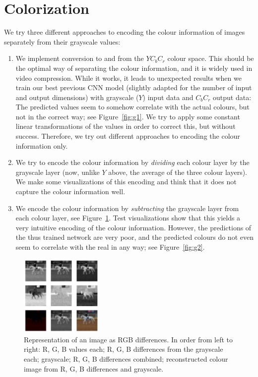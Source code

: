 \documentclass[conference]{IEEEtran}
\begin{document}
\newpage

\section{Colorization}

We try three different approaches to encoding the colour information of images separately from their grayscale values: 

\begin{enumerate}
    \item We implement conversion to and from the $YC_bC_r$ colour space. This should be the optimal way of separating the colour information, and it is widely used in video compression. While it works, it leads to unexpected results when we train our best previous CNN model (slightly adapted for the number of input and output dimensions) with grayscale ($Y$) input data and $C_bC_r$ output data: The predicted values seem to somehow correlate with the actual colours, but not in the correct way; see Figure~\ref{fig:g1}. We try to apply some constant linear transformations of the values in order to correct this, but without success. Therefore, we try out different approaches to encoding the colour information only. 
    \item We try to encode the colour information by \textit{dividing} each colour layer by the grayscale layer (now, unlike $Y$ above, the average of the three colour layers). We make some visualizations of this encoding and think that it does not capture the colour information well.
    \item We encode the colour information by \textit{subtracting} the grayscale layer from each colour layer, see Figure~\ref{fig:genc}. Test visualizations show that this yields a very intuitive encoding of the colour information. However, the predictions of the thus trained network are very poor, and the predicted colours do not even seem to correlate with the real in any way; see Figure~\ref{fig:g2}.
\end{enumerate}

\begin{figure}[b]
    \centering
    \includegraphics[width=4cm]{encoding.png}
    \caption{Representation of an image as RGB differences. In order from left to right: R, G, B values each; R, G, B differences from the grayscale each; grayscale; R, G, B differences combined; reconstructed colour image from R, G, B differences and grayscale.}
    \label{fig:genc}
\end{figure}
\end{document}
